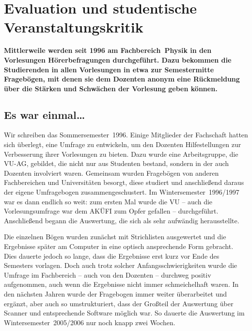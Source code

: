 \section{Evaluation und studentische Veranstaltungskritik}
\vspace{-3ex}
\begin{multicols}{2}
\textbf{Mittlerweile werden seit 1996 am Fachbereich~Physik in den Vorlesungen Hörerbefragungen durchgeführt. Dazu bekommen die Studierenden in allen Vorlesungen in etwa zur Semestermitte Fragebögen, mit denen sie dem Dozenten anonym eine Rückmeldung über die Stärken und Schwächen der Vorlesung geben können.}

\vspace{-1em}
\subsection*{Es war einmal\dots}
\vspace{-1em}
Wir schreiben das Sommersemester~1996. Einige Mitglieder der Fachschaft hatten sich überlegt, eine Umfrage zu entwickeln, um den Dozenten Hilfestellungen zur Verbesserung ihrer Vorlesungen zu bieten. Dazu wurde eine Arbeitsgruppe, die VU-AG, gebildet, die nicht nur aus Studenten bestand, sondern in der auch Dozenten involviert waren. Gemeinsam wurden Fragebögen von anderen Fachbereichen und Universitäten besorgt, diese studiert und anschließend daraus der eigene Umfragebogen zusammengeschustert. Im Wintersemester~1996/1997 war es dann endlich so weit: zum ersten Mal wurde die VU -- auch die Vorlesungsumfrage war dem AKÜFI zum Opfer gefallen -- durchgeführt. Anschließend begann die Auswertung, die sich als sehr aufwändig herausstellte.

Die einzelnen Bögen wurden zunächst mit Strichlisten ausgewertet und die Ergebnisse später am Computer in eine optisch ansprechende Form gebracht. Dies dauerte jedoch so lange, dass die Ergebnisse erst kurz vor Ende des Semesters vorlagen. Doch auch trotz solcher Anfangsschwierigkeiten wurde die Umfrage im Fachbereich -- auch von den Dozenten -- durchweg positiv aufgenommen, auch wenn die Ergebnisse nicht immer schmeichelhaft waren. In den nächsten Jahren wurde der Fragebogen immer weiter überarbeitet und ergänzt, aber auch so umstrukturiert, dass der Großteil der Auswertung über Scanner und entsprechende Software möglich war. So dauerte die Auswertung im Wintersemester~2005/2006 nur noch knapp zwei Wochen.

\vspace{-1em}

\end{multicols}
